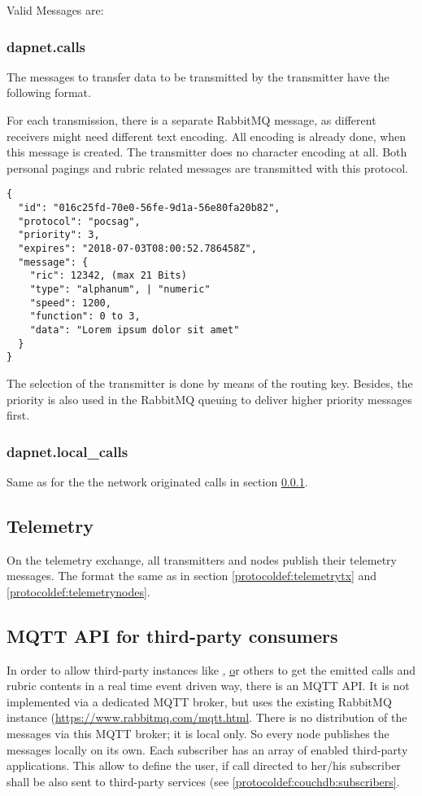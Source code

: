 Valid Messages are:

\subsubsection{dapnet.calls}
\label{protocoldef:RabbitMQ:dapnet.calls}
The messages to transfer data to be transmitted by the transmitter have the
following format.

For each transmission, there is a separate RabbitMQ message, as different
receivers might need different text encoding. All encoding is already done, when
this message is created. The transmitter does no character encoding at all. Both
personal pagings and rubric related messages are transmitted with this protocol.

\begin{lstlisting}
{
  "id": "016c25fd-70e0-56fe-9d1a-56e80fa20b82",
  "protocol": "pocsag",
  "priority": 3,
  "expires": "2018-07-03T08:00:52.786458Z",
  "message": {
    "ric": 12342, (max 21 Bits)
    "type": "alphanum", | "numeric"
    "speed": 1200,
    "function": 0 to 3,
    "data": "Lorem ipsum dolor sit amet"
  }
}
\end{lstlisting}
The selection of the transmitter is done by means of the routing key. Besides,
the priority is also used in the RabbitMQ queuing to deliver higher priority
messages first.

\subsubsection{dapnet.local\_calls}
\label{protocoldef:RabbitMQ:dapnet.local_calls}
Same as for the the network originated calls in section \ref{protocoldef:RabbitMQ:dapnet.calls}.

\subsection{Telemetry}
On the telemetry exchange, all transmitters and nodes publish their telemetry messages. The format the same as in section \ref{protocoldef:telemetrytx} and \ref{protocoldef:telemetrynodes}.

\subsection{MQTT API for third-party consumers}
\label{protocoldef:mqttapi}
In order to allow third-party instances like \href{http://www.aprs-is.net/|APRS}, \href{http://brandmeister.network|Brandmeister} or others to get the emitted calls and rubric contents in a real time event driven way, there is an MQTT API. It is not implemented via a dedicated MQTT broker, but uses the existing RabbitMQ instance (\url{https://www.rabbitmq.com/mqtt.html}. There is no distribution of the messages via this MQTT broker; it is local only. So every node publishes the messages locally on its own.
Each subscriber has an array of enabled third-party applications. This allow to define the user, if call directed to her/his subscriber shall be also sent to third-party services (see \ref{protocoldef:couchdb:subscribers}.

